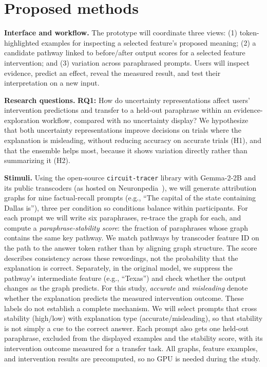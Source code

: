 \documentclass[sigconf,balance=false]{acmart}
\begin{document}
\section{Proposed methods}
\textbf{Interface and workflow.} The prototype will coordinate three views: (1) token-highlighted examples for inspecting a selected feature's proposed meaning; (2) a candidate pathway linked to before/after output scores for a selected feature intervention; and (3) variation across paraphrased prompts. Users will inspect evidence, predict an effect, reveal the measured result, and test their interpretation on a new input.

\textbf{Research questions.}
\textbf{RQ1:} How do uncertainty representations affect users' intervention predictions and transfer to a held-out paraphrase within an evidence-exploration workflow, compared with no uncertainty display? We hypothesize that both uncertainty representations improve decisions on trials where the explanation is misleading, without reducing accuracy on accurate trials (H1), and that the ensemble helps most, because it shows variation directly rather than summarizing it (H2).

\textbf{Stimuli.}
Using the open-source \texttt{circuit-tracer} library with Gemma-2-2B and its public transcoders (as hosted on Neuronpedia~\cite{lin2023neuronpedia}), we will generate attribution graphs for nine factual-recall prompts (e.g., ``The capital of the state containing Dallas is''), three per condition so conditions balance within participants. For each prompt we will write six paraphrases, re-trace the graph for each, and compute a \emph{paraphrase-stability score}: the fraction of paraphrases whose graph contains the same key pathway. We match pathways by transcoder feature ID on the path to the answer token rather than by aligning graph structure. The score describes consistency across these rewordings, not the probability that the explanation is correct. Separately, in the original model, we suppress the pathway's intermediate feature (e.g., ``Texas'') and check whether the output changes as the graph predicts. For this study, \emph{accurate} and \emph{misleading} denote whether the explanation predicts the measured intervention outcome. These labels do not establish a complete mechanism. We will select prompts that cross stability (high/low) with explanation type (accurate/misleading), so that stability is not simply a cue to the correct answer. Each prompt also gets one held-out paraphrase, excluded from the displayed examples and the stability score, with its intervention outcome measured for a transfer task. All graphs, feature examples, and intervention results are precomputed, so no GPU is needed during the study.
\end{document}
